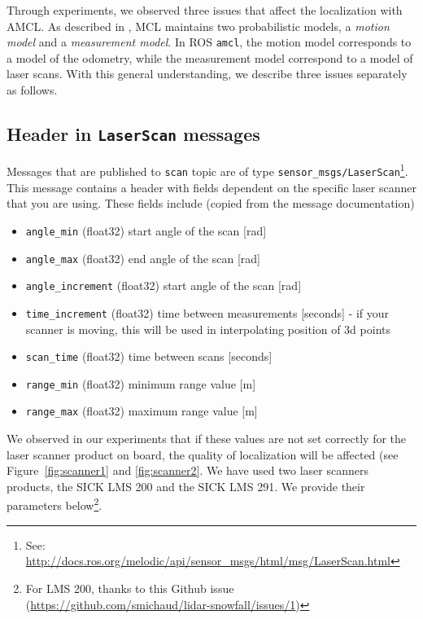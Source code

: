 \documentclass[12pt]{article}
\begin{document}
Through experiments, we observed three issues that affect the localization with AMCL. As described in \cite{thrun2005probabilistic}, MCL maintains two probabilistic models, a \emph{motion model} and a \emph{measurement model}. In ROS \texttt{amcl}, the motion model corresponds to a model of the odometry, while the measurement model correspond to a model of laser scans. With this general understanding, we describe three issues separately as follows. 

\subsection{Header in \texttt{LaserScan} messages}

Messages that are published to \texttt{scan} topic are of type \texttt{sensor\_msgs/LaserScan}\footnote{See: \url{http://docs.ros.org/melodic/api/sensor_msgs/html/msg/LaserScan.html}}. This message contains a header with fields dependent on the specific laser scanner that you are using. These fields include (copied from the message documentation)

\begin{itemize}
\item \texttt{angle\_min} (float32) start angle of the scan [rad]
\item \texttt{angle\_max} (float32) end angle of the scan [rad]
\item \texttt{angle\_increment} (float32)  start angle of the scan [rad]
\item \texttt{time\_increment} (float32) time between measurements [seconds] - if your scanner is moving, this will be used in interpolating position of 3d points
\item \texttt{scan\_time} (float32) time between scans [seconds]
\item \texttt{range\_min} (float32) minimum range value [m]
\item \texttt{range\_max} (float32) maximum range value [m]
\end{itemize}

We observed in our experiments that if these values are not set correctly for the laser scanner product on board, the quality of localization will be affected (see Figure~\ref{fig:scanner1} and \ref{fig:scanner2}. We have used two laser scanners products, the SICK LMS 200 and the SICK LMS 291. We provide their parameters below\footnote{For LMS 200, thanks to {this Github issue} (\url{https://github.com/smichaud/lidar-snowfall/issues/1})}.
\end{document}
